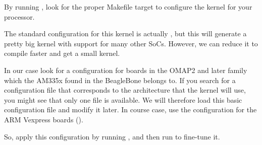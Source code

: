 By running , look for the proper Makefile target to
configure the kernel for your processor.

{The standard configuration for this kernel is actually ,
but this will generate a pretty big kernel with support for many other
SoCs. However, we can reduce it to compile faster and get a small
kernel.}{}

{In our case look for a configuration for boards in the OMAP2 and
later family which the AM335x found in the BeagleBone belongs to.}{}
{If you search for a configuration file that corresponds to the 
architecture that the kernel will use, you might see that only one
 file is available. We will therefore load this basic
configuration file and modify it later.}{}
{In course case, use the configuration for the ARM Vexpress boards
().}{}

So, apply this configuration by running , and
then run  to fine-tune it.

